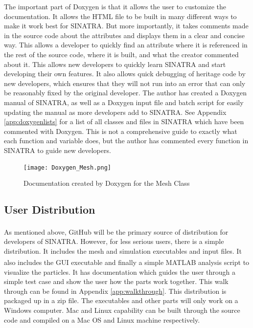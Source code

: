 \indent The important part of Doxygen is that it allows the user to customize the documentation. It allows the HTML file to be built in many different ways to make it work best for SINATRA. But more importantly, it takes comments made in the source code about the attributes and displays them in a clear and concise way. This allows a developer to quickly find an attribute where it is referenced in the rest of the source code, where it is built, and what the creator commented about it. This allows new developers to quickly learn SINATRA and start developing their own features. It also allows quick debugging of heritage code by new developers, which ensures that they will not run into an error that can only be reasonably fixed by the original developer. The author has created a Doxygen manual of SINATRA, as well as a Doxygen input file and batch script for easily updating the manual as more developers add to SINATRA. See Appendix \ref{app:doxygenlists} for a list of all classes and files in SINATRA which have been commented with Doxygen. This is not a comprehensive guide to exactly what each function and variable does, but the author has commented every function in SINATRA to guide new developers. 


\begin{figure}
\texttt{[image: Doxygen\_Mesh.png]}
\centering
\caption{Documentation created by Doxygen for the Mesh Class}
\label{fig:Doxygen_Mesh}
\end{figure}


\subsection{User Distribution}

As mentioned above, GitHub\textsuperscript{\textregistered} will be the primary source of distribution for developers of SINATRA. However, for less serious users, there is a simple distribution. It includes the mesh and simulation executables and input files. It also includes the GUI executable and finally a simple MATLAB\textsuperscript{\textregistered} analysis script to visualize the particles. It has documentation which guides the user through a simple test case and show the user how the parts work together. This walk through can be found in Appendix \ref{app:walkthrough}. This distribution is packaged up in a zip file. The executables and other parts will only work on a Windows computer. Mac and Linux capability can be built through the source code and compiled on a Mac OS and Linux machine respectively. \par 


